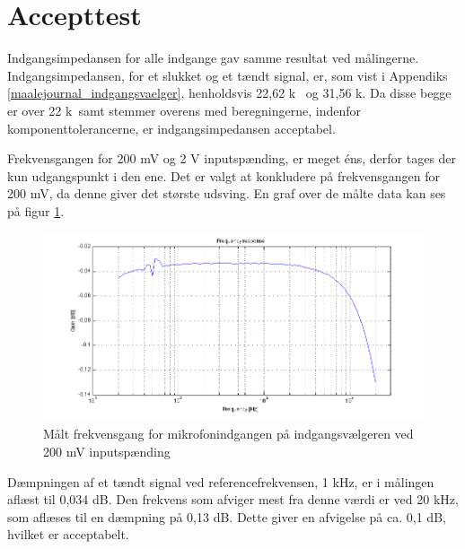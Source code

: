 \section{Accepttest}
Indgangsimpedansen for alle indgange gav samme resultat ved målingerne. Indgangsimpedansen, for et slukket og et tændt signal, er, som vist i Appendiks \ref{maalejournal_indgangsvaelger}, henholdsvis 22,62 k\ohm~ og 31,56 k\ohm . Da disse begge er over 22 k\ohm~samt stemmer overens med beregningerne, indenfor komponenttolerancerne, er indgangsimpedansen acceptabel.

Frekvensgangen for 200 mV og 2 V inputspænding, er meget éns, derfor tages der kun udgangspunkt i den ene. Det er valgt at konkludere på frekvensgangen for 200 mV, da denne giver det største udsving. En graf over de målte data kan ses på figur \ref{fig:indacc:frek200mv}.
\begin{figure}[h]
\centering
\includegraphics[width=\textwidth]{maalerapporter/indgangsvaelger/Indgangsvlger-mic-200mv-frek.png}
\caption{Målt frekvensgang for mikrofonindgangen på indgangsvælgeren ved 200 mV inputspænding}
\label{fig:indacc:frek200mv}
\end{figure}

Dæmpningen af et tændt signal ved referencefrekvensen, 1 kHz, er i målingen aflæst til 0,034 dB. Den frekvens som afviger mest fra denne værdi er ved 20 kHz, som aflæses til en dæmpning på 0,13 dB. Dette giver en afvigelse på ca. 0,1 dB, hvilket er acceptabelt. 

